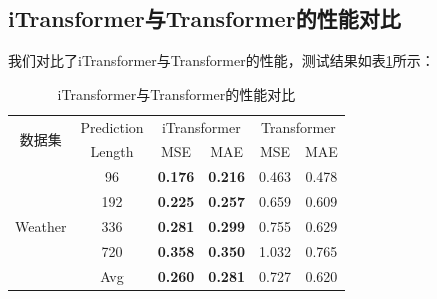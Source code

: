 \documentclass[twoside,12pt]{article}
\begin{document}
\subsection{iTransformer与Transformer的性能对比}
我们对比了iTransformer与Transformer的性能，测试结果如表\ref{tab:itransformer_vs_transformer}所示：
\begin{table}[htbp]
  \caption{iTransformer与Transformer的性能对比}
  \label{tab:itransformer_vs_transformer}
  \vspace{5pt}
  \centering
  \begin{tabular}{c|c|cc|cc}
    \toprule
    \multirow{2}{*}{数据集}  & Prediction & \multicolumn{2}{c|}{iTransformer} & \multicolumn{2}{c}{Transformer}                 \\
    \cmidrule(lr){3-4} \cmidrule(lr){5-6}
                             & Length     & MSE                               & MAE                             & MSE   & MAE   \\
    \midrule
    \multirow{5}{*}{Weather} & 96         & \textbf{0.176}                    & \textbf{0.216}                  & 0.463 & 0.478 \\
                             & 192        & \textbf{0.225}                    & \textbf{0.257}                  & 0.659 & 0.609 \\
                             & 336        & \textbf{0.281}                    & \textbf{0.299}                  & 0.755 & 0.629 \\
                             & 720        & \textbf{0.358}                    & \textbf{0.350}                  & 1.032 & 0.765 \\
    \cmidrule(lr){2-6}
                             & Avg        & \textbf{0.260}                    & \textbf{0.281}                  & 0.727 & 0.620 \\
    \bottomrule
    \bottomrule
  \end{tabular}
\end{table}
\end{document}
